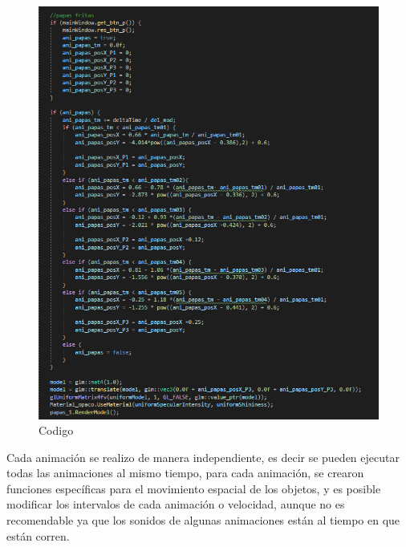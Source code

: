\documentclass[letter,12pt]{article}
\begin{document}
\begin{figure}[H]
		\includegraphics[scale=1]{img/img7}
		\centering
		\caption{Codigo}
	\end{figure}

Cada animación se realizo de manera independiente, es decir se pueden ejecutar todas las animaciones al mismo tiempo, para cada animación, se crearon funciones específicas para el movimiento espacial de los objetos, y es posible modificar los intervalos de cada animación o velocidad, aunque no es recomendable ya que los sonidos de algunas animaciones están al tiempo en que están corren.
\end{document}
